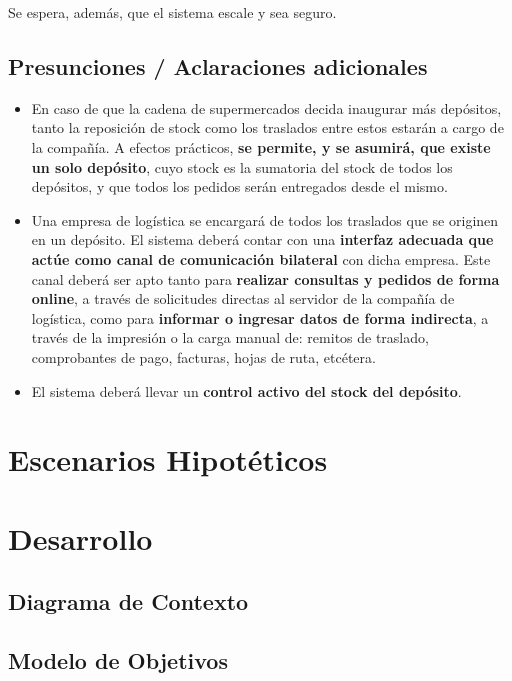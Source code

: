 \documentclass[11pt, a4paper, twoside]{article}
\begin{document}
Se espera, además, que el sistema escale y sea seguro.

  \subsection{Presunciones / Aclaraciones adicionales}
  
  \begin{itemize}

  \item En caso de que la cadena de supermercados decida inaugurar más
depósitos, tanto la reposición de stock como los traslados entre estos estarán a
cargo de la compañía. A efectos prácticos, \textbf{se permite, y se asumirá, que
existe un solo depósito}, cuyo stock es la sumatoria del stock de todos los
depósitos, y que todos los pedidos serán entregados desde el mismo.

  \item Una empresa de logística se encargará de todos los traslados que se
originen en un depósito. El sistema deberá contar con una \textbf{interfaz
adecuada que actúe como canal de comunicación bilateral} con dicha empresa. Este
canal deberá ser apto tanto para \textbf{realizar consultas y pedidos de forma
online}, a través de solicitudes directas al servidor de la compañía de
logística, como para \textbf{informar o ingresar datos de forma indirecta}, a
través de la impresión o la carga manual de: remitos de traslado, comprobantes
de pago, facturas, hojas de ruta, etcétera.

  \item El sistema deberá llevar un \textbf{control activo del stock del
depósito}.


  \end{itemize}

\newpage

\fixme

\newpage
\section{Escenarios Hipotéticos}

\fixme

\newpage
\section{Desarrollo}

\fixme

\newpage


  \subsection{Diagrama de Contexto}

  \fixme

  \newpage


  \subsection{Modelo de Objetivos}

  \fixme

  \newpage
\end{document}
